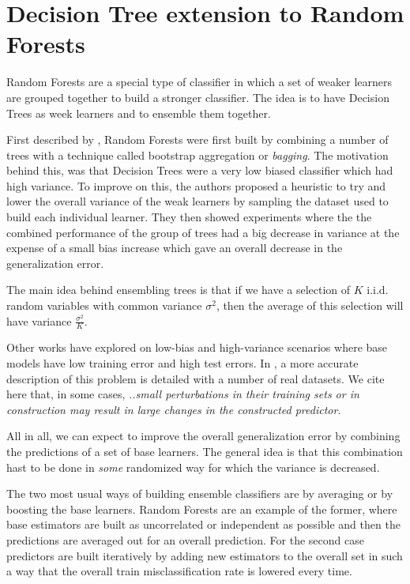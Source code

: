 \section{Decision Tree extension to Random Forests}\label{section-randomForests}

Random Forests are a special type of classifier in which a set of weaker learners are grouped together to build a stronger classifier. The idea is to have Decision Trees as week learners and to ensemble them together. 

First described by \cite{HoFirstRandomForest}, Random  Forests were first built by combining a number of trees with a technique called bootstrap aggregation or \textit{bagging}. The  motivation behind this, was that Decision Trees were a very low biased classifier which had high variance. To improve on this, the authors proposed a heuristic to try and lower the overall variance of the weak learners by sampling the dataset used to build each individual learner. They then showed experiments where the the combined performance of the group of trees had a big decrease in variance at the expense of a small bias increase which gave an overall decrease in the generalization error.

The main idea behind ensembling trees is that if we have a selection of $K$ i.i.d. random variables with common variance $\sigma^2$, then the average of this selection will have variance $\frac{\sigma^2}{K}$. 

Other works have explored on low-bias and high-variance scenarios where base models have low training error and high test errors. In \cite{breiman-arcingclassifiers}, a more accurate description of this problem is detailed with a number of real datasets. We cite here that, in some cases, \textit{..small perturbations in their  training  sets  or  in  construction  may  result  in  large  changes  in  the  constructed  predictor}.

All in all, we can expect to improve the  overall generalization error  by combining the predictions of a set of base learners. The general idea is that this combination hast to be done in  \textit{some} randomized way for which the variance is decreased.

The two most usual ways of building ensemble classifiers are by averaging or by boosting the base learners. Random Forests are an example of the former, where base estimators are built as uncorrelated or independent as possible and then the predictions are averaged out for an overall prediction. For the second case predictors are built iteratively by adding new estimators to the overall set in such a way that the overall train misclassification rate is lowered every time.

